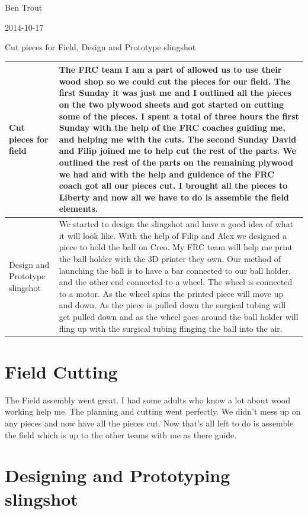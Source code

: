Ben Trout

2014-10-17

Cut pieces for Field, Design and Prototype slingshot

\begin{tabular}{|p{5cm}|p{5cm}|}
\hline
Cut pieces for field&
The FRC team I am a part of allowed us to use their wood shop so we could cut the pieces for our field. The first Sunday it was just me and I outlined all the pieces on the two plywood sheets and got started on cutting some of the pieces. I spent a total of three hours the first Sunday with the help of the FRC coaches guiding me, and helping me with the cuts. The second Sunday David and Filip joined me to help cut the rest of the parts. We outlined the rest of the parts on the remaining plywood we had and with the help and guidence of the FRC coach got all our pieces cut. I brought all the pieces to Liberty and now all we have to do is assemble the field elements.
\\
\hline
Design and Prototype slingshot&
We started to design the slingshot and have a good idea of what it will look like. With the help of Filip and Alex we designed a piece to hold the ball on Creo. My FRC team will help me print the ball holder with the 3D printer they own. Our method of launching the ball is to have a bar connected to our ball holder, and the other end connected to a wheel. The wheel is connected to a motor. As the wheel spins the printed piece will move up and down. As the piece is pulled down the surgical tubing will get pulled down and as the wheel goes around the ball holder will fling up with the surgical tubing flinging the ball into the air.
\\
\hline
\end{tabular}

\section*{Field Cutting}

The Field assembly went great. I had some adults who know a lot about wood working help me. The planning and cutting went perfectly. We didn't mess up on any pieces and now have all the pieces cut. Now that's all left to do is assemble the field which is up to the other teams with me as there guide. 

\section*{Designing and Prototyping slingshot}

